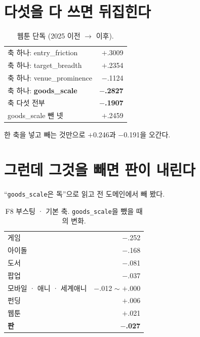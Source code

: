 \documentclass[10pt]{article}
\begin{document}

\section{다섯을 다 쓰면 뒤집힌다}

\begin{table}[t]
\centering\tsize
\caption{웹툰 단독 (2025 이전 $\to$ 이후).}
\begin{tabular}{lr}
\toprule
축 하나: entry\_friction & $+$.3009 \\
축 하나: target\_breadth & $+$.2354 \\
축 하나: venue\_prominence & $-$.1124 \\
축 하나: \textbf{goods\_scale} & \textbf{$-$.2827} \\
\midrule
축 다섯 전부 & \textbf{$-$.1907} \\
goods\_scale 뺀 넷 & $+$.2459 \\
\bottomrule
\end{tabular}
\end{table}

한 축을 넣고 빼는 것만으로 $+$0.246과 $-$0.191을 오간다.

\section{그런데 그것을 빼면 판이 내린다}

``\texttt{goods\_scale}은 독''으로 읽고 전 도메인에서 빼 봤다.

\begin{table}[t]
\centering\tsize
\caption{F8 부스팅 · 기본 축. \texttt{goods\_scale}을 뺐을 때의 변화.}
\begin{tabular}{lr}
\toprule
게임 & $-$.252 \\
아이돌 & $-$.168 \\
도서 & $-$.081 \\
팝업 & $-$.037 \\
모바일 · 애니 · 세계애니 & $-$.012 $\sim$ $+$.000 \\
펀딩 & $+$.006 \\
웹툰 & $+$.021 \\
\midrule
\textbf{판} & \textbf{$-$.027} \\
\bottomrule
\end{tabular}
\end{table}
\end{document}
